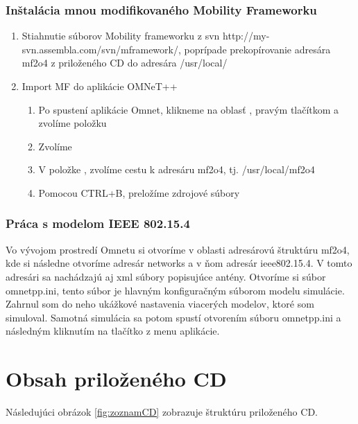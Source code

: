 \documentclass[11pt,twoside,a4paper]{book}
\begin{document}
\subsection{Inštalácia mnou modifikovaného Mobility Frameworku}
\begin{enumerate}
 \item Stiahnutie súborov Mobility frameworku z svn http://my-svn.assembla.com/svn/mframework/, poprípade prekopírovanie adresára mf2o4 z priloženého CD do adresára /usr/local/
 \item Import MF do aplikácie OMNeT++
  \begin{enumerate}
   \item Po spustení aplikácie Omnet, klikneme na oblasť , pravým tlačítkom a zvolíme položku 
   \item Zvolíme 
   \item V položke , zvolíme cestu k adresáru mf2o4, tj. /usr/local/mf2o4
   \item Pomocou CTRL+B, preložíme zdrojové súbory
  \end{enumerate}  
\end{enumerate}

\subsection{Práca s modelom IEEE 802.15.4}
Vo vývojom prostredí Omnetu si otvoríme v oblasti  adresárovú štruktúru mf2o4, kde si následne otvoríme adresár networks a v ňom adresár ieee802.15.4. V tomto adresári sa nachádzajú aj xml súbory popisujúce antény. Otvoríme si súbor omnetpp.ini, tento súbor je hlavným konfiguračným súborom modelu simulácie. Zahrnul som do neho ukážkové nastavenia viacerých modelov, ktoré som simuloval. Samotná simulácia sa potom spustí otvorením súboru omnetpp.ini a následným kliknutím na tlačítko  z menu aplikácie.

\chapter{Obsah priloženého CD}

Následujúci obrázok \ref{fig:zoznamCD} zobrazuje štruktúru priloženého CD.
% 
\end{document}
